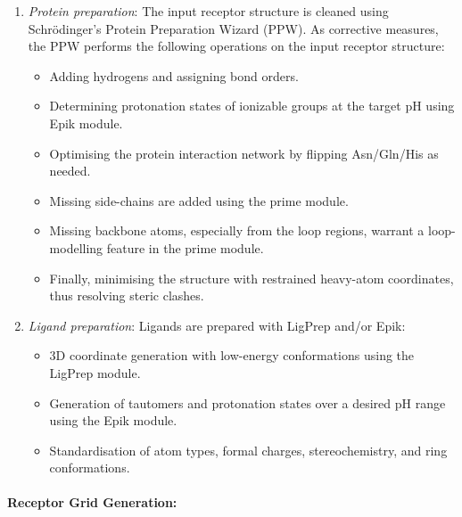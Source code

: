 \documentclass[12pt]{article}
\begin{document}
\begin{enumerate}
  \item \emph{Protein preparation}: The input receptor structure is cleaned using Schr\"{o}dinger's Protein Preparation Wizard (PPW). As corrective measures, the PPW performs the following operations on the input receptor structure:
    \begin{itemize}
      \item Adding hydrogens and assigning bond orders.
      \item Determining protonation states of ionizable groups at the target pH using Epik\cite{CH7_epik} module.
      \item Optimising the protein interaction network by flipping Asn/Gln/His as needed.
      \item Missing side-chains are added using the prime module.
      \item Missing backbone atoms, especially from the loop regions, warrant a loop-modelling feature in the prime module.
      \item Finally, minimising the structure with restrained heavy-atom coordinates, thus resolving steric clashes.
    \end{itemize}

  \item \emph{Ligand preparation}: Ligands are prepared with LigPrep and/or Epik:
    \begin{itemize}
      \item 3D coordinate generation with low-energy conformations using the LigPrep module.
      \item Generation of tautomers and protonation states over a desired pH range using the Epik module.
      \item Standardisation of atom types, formal charges, stereochemistry, and ring conformations.
    \end{itemize}
\end{enumerate}

\paragraph{Receptor Grid Generation:}
\end{document}
